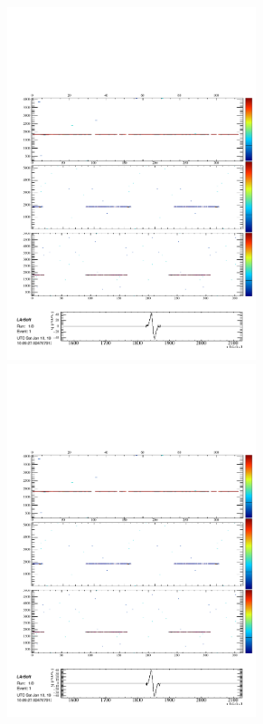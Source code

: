 \begin{figure}
\begin{subfigure}[t]{\linewidth}
\begin{minipage}{0.48\textwidth}
      \includegraphics[width=0.8\textwidth]{SimulatedMuonV1.pdf}
      \includegraphics[width=0.8\textwidth]{SimulatedMuonV2.pdf}

\end{minipage}
\end{subfigure}
\end{figure}
